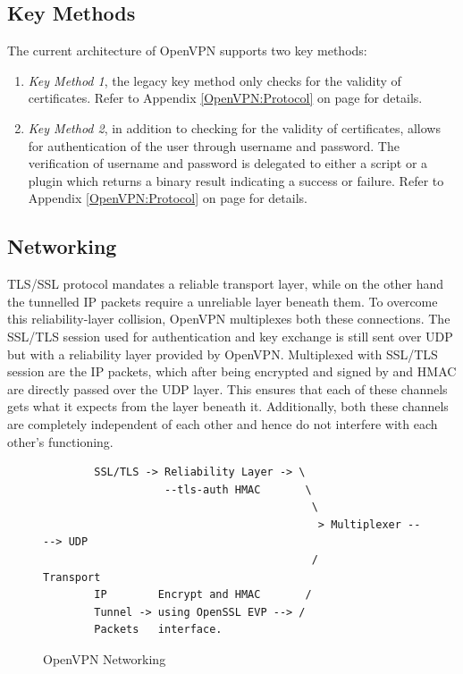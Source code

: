 \documentclass[11pt,oneside]{book}
\begin{document}
\subsection{Key Methods}
The current architecture of OpenVPN supports two key methods:

\begin{enumerate}
    \item \emph{Key Method 1}, the legacy key method only checks for the validity of certificates.
        Refer to Appendix \ref{OpenVPN:Protocol} on page \pageref{OpenVPN:Protocol} for details.
    \item \emph{Key Method 2}, in addition to checking for the validity of certificates, allows for
        authentication of the user through username and password. The verification of username and
        password is delegated to either a script or a plugin which returns a binary result
        indicating a success or failure.
        Refer to Appendix \ref{OpenVPN:Protocol} on page \pageref{OpenVPN:Protocol} for details.
\end{enumerate}


\subsection{Networking}
TLS/SSL protocol mandates a reliable transport layer, while on the other hand the tunnelled IP
packets require a unreliable layer beneath them. To overcome this reliability-layer collision,
OpenVPN multiplexes both these connections.
The SSL/TLS session used for authentication and key exchange is still sent over UDP but with a
reliability layer provided by OpenVPN. Multiplexed with SSL/TLS session are the IP packets, which
after being encrypted and signed by and HMAC are directly passed over the UDP layer. This ensures
that each of these channels gets what it expects from the layer beneath it. Additionally, both these
channels are completely independent of each other and hence do not interfere with each other's
functioning.\\

\begin{figure}[h]
    \begin{verbatim}
        SSL/TLS -> Reliability Layer -> \
                   --tls-auth HMAC       \
                                          \
                                           > Multiplexer ----> UDP
                                          /                    Transport
        IP        Encrypt and HMAC       /
        Tunnel -> using OpenSSL EVP --> /
        Packets   interface.
    \end{verbatim}
    \vspace{-6mm}
    \caption{OpenVPN Networking}
\end{figure}
\end{document}
